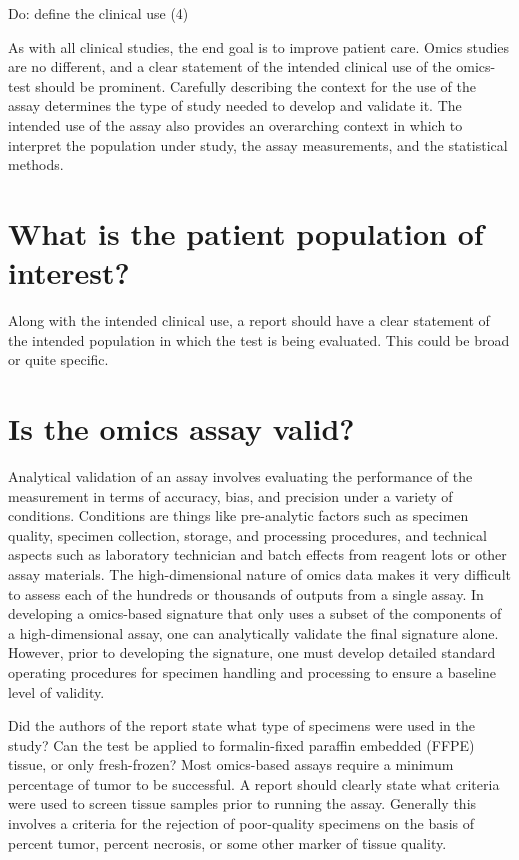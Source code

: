 \documentclass[11pt]{article}
\begin{document}
Do: define the clinical use (4)

As with all clinical studies, the end goal is to improve patient care.
Omics studies are no different, and a clear statement of the intended
clinical use of the omics-test should be prominent. Carefully describing
the context for the use of the assay determines the type of study needed
to develop and validate it. The intended use of the assay also provides
an overarching context in which to interpret the population under study,
the assay measurements, and the statistical methods.

\section{What is the patient population of
interest?}\label{what-is-the-patient-population-of-interest}

Along with the intended clinical use, a report should have a clear
statement of the intended population in which the test is being
evaluated. This could be broad or quite specific.

\section{Is the omics assay valid?}\label{is-the-omics-assay-valid}

Analytical validation of an assay involves evaluating the performance of
the measurement in terms of accuracy, bias, and precision under a
variety of conditions. Conditions are things like pre-analytic factors
such as specimen quality, specimen collection, storage, and processing
procedures, and technical aspects such as laboratory technician and
batch effects from reagent lots or other assay materials. The
high-dimensional nature of omics data makes it very difficult to assess
each of the hundreds or thousands of outputs from a single assay. In
developing a omics-based signature that only uses a subset of the
components of a high-dimensional assay, one can analytically validate
the final signature alone. However, prior to developing the signature,
one must develop detailed standard operating procedures for specimen
handling and processing to ensure a baseline level of validity.

Did the authors of the report state what type of specimens were used in
the study? Can the test be applied to formalin-fixed paraffin embedded
(FFPE) tissue, or only fresh-frozen? Most omics-based assays require a
minimum percentage of tumor to be successful. A report should clearly
state what criteria were used to screen tissue samples prior to running
the assay. Generally this involves a criteria for the rejection of
poor-quality specimens on the basis of percent tumor, percent necrosis,
or some other marker of tissue quality.
\end{document}
